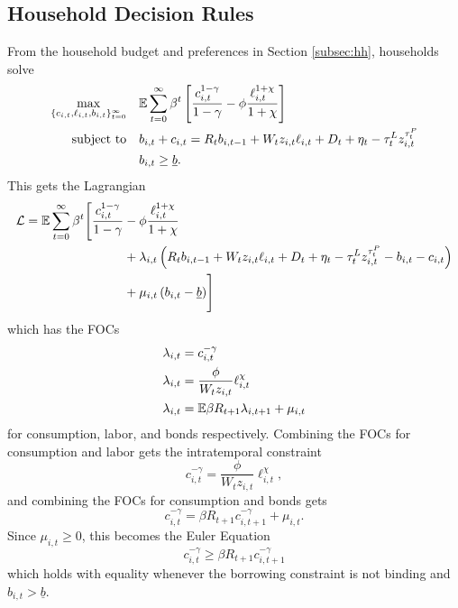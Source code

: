 \subsection{Household Decision Rules}

From the household budget and preferences in Section \ref{subsec:hh}, households solve
\begin{alignat*}{4}
    \max_{\{c_{i, t}, \ell_{i, t}, b_{i, t}\}_{t = 0}^\infty} \quad & \mathbb{E} \sum_{t = 0}^\infty \beta^t \left[ \frac{c_{i, t}^{1 - \gamma}}{1 - \gamma} - \phi \frac{\ell_{i, t}^{1 + \chi}}{1 + \chi} \right] \\
    \text{subject to} \quad & b_{i, t} + c_{i, t} = R_t b_{i, t-1} + W_t z_{i, t} \ell_{i, t} + D_t + \eta_t - \tau_t^L z_{i, t}^{\tau_t^P} \\
    & b_{i, t} \geq \underline{b}.
\end{alignat*}
This gets the Lagrangian
\begin{align*}
    \mathcal{L} = \mathbb{E} \sum_{t = 0}^\infty \beta^t \Biggl[ \frac{c_{i, t}^{1 - \gamma}}{1 - \gamma} &- \phi \frac{\ell_{i, t}^{1 + \chi}}{1 + \chi} \\
     &+ \lambda_{i, t} \left( R_t b_{i, t-1} + W_t z_{i, t} \ell_{i, t} + D_t + \eta_t - \tau_t^L z_{i, t}^{\tau_t^P} - b_{i, t} - c_{i, t} \right) \notag \\
     &+ \mu_{i, t} \left(b_{i, t} - \underline{b} \right) \Biggr] \notag
\end{align*}
which has the FOCs
\begin{align*}
    \lambda_{i, t} &= c_{i, t}^{-\gamma} \\
    \lambda_{i, t} &= \frac{\phi}{W_t z_{i, t}} \ell_{i, t}^\chi \\
    \lambda_{i, t} &= \mathbb{E} \beta R_{t + 1} \lambda_{i, t+1} + \mu_{i, t}
\end{align*}
for consumption, labor, and bonds respectively. Combining the FOCs for consumption and labor gets the intratemporal constraint
\begin{equation*}
    c_{i, t}^{-\gamma} = \frac{\phi}{W_t z_{i, t}} \ell_{i, t}^\chi,
\end{equation*}
and combining the FOCs for consumption and bonds gets
\begin{equation*}
    c_{i, t}^{-\gamma} = \beta R_{t + 1} c_{i, t + 1}^{-\gamma} + \mu_{i, t}.
\end{equation*}
Since $\mu_{i, t} \geq 0$, this becomes the Euler Equation
\begin{equation*}
    c_{i, t}^{-\gamma} \geq \beta R_{t + 1} c_{i, t + 1}^{-\gamma}
\end{equation*}
which holds with equality whenever the borrowing constraint is not binding and $b_{i, t} > \underline{b}$.


